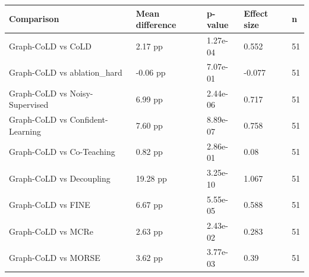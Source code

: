 \small
\begin{tabular}{lllll}
\hline
Comparison & Mean difference & p-value & Effect size & n \\
\hline
Graph-CoLD vs CoLD & 2.17 pp & 1.27e-04 & 0.552 & 51 \\
Graph-CoLD vs ablation\_hard & -0.06 pp & 7.07e-01 & -0.077 & 51 \\
Graph-CoLD vs Noisy-Supervised & 6.99 pp & 2.44e-06 & 0.717 & 51 \\
Graph-CoLD vs Confident-Learning & 7.60 pp & 8.89e-07 & 0.758 & 51 \\
Graph-CoLD vs Co-Teaching & 0.82 pp & 2.86e-01 & 0.08 & 51 \\
Graph-CoLD vs Decoupling & 19.28 pp & 3.25e-10 & 1.067 & 51 \\
Graph-CoLD vs FINE & 6.67 pp & 5.55e-05 & 0.588 & 51 \\
Graph-CoLD vs MCRe & 2.63 pp & 2.43e-02 & 0.283 & 51 \\
Graph-CoLD vs MORSE & 3.62 pp & 3.77e-03 & 0.39 & 51 \\
\hline
\end{tabular}
